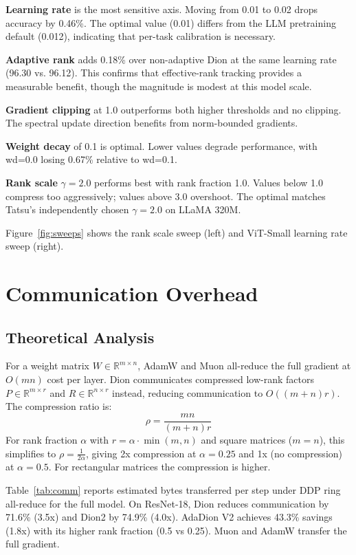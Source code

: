 \documentclass[10pt,twocolumn]{article}
\begin{document}
\textbf{Learning rate} is the most sensitive axis. Moving from 0.01 to 0.02 drops accuracy by 0.46\%. The optimal value (0.01) differs from the LLM pretraining default (0.012), indicating that per-task calibration is necessary.

\textbf{Adaptive rank} adds 0.18\% over non-adaptive Dion at the same learning rate (96.30 vs. 96.12). This confirms that effective-rank tracking provides a measurable benefit, though the magnitude is modest at this model scale.

\textbf{Gradient clipping} at 1.0 outperforms both higher thresholds and no clipping. The spectral update direction benefits from norm-bounded gradients.

\textbf{Weight decay} of 0.1 is optimal. Lower values degrade performance, with wd=0.0 losing 0.67\% relative to wd=0.1.

\textbf{Rank scale} $\gamma = 2.0$ performs best with rank fraction 1.0. Values below 1.0 compress too aggressively; values above 3.0 overshoot. The optimal matches Tatsu's independently chosen $\gamma = 2.0$ on LLaMA 320M.

Figure~\ref{fig:sweeps} shows the rank scale sweep (left) and ViT-Small learning rate sweep (right).

\section{Communication Overhead}

\subsection{Theoretical Analysis}

For a weight matrix $W \in \mathbb{R}^{m \times n}$, AdamW and Muon all-reduce the full gradient at $O(mn)$ cost per layer. Dion communicates compressed low-rank factors $P \in \mathbb{R}^{m \times r}$ and $R \in \mathbb{R}^{n \times r}$ instead, reducing communication to $O((m+n)r)$. The compression ratio is:
\[
\rho = \frac{mn}{(m+n)r}
\]
For rank fraction $\alpha$ with $r = \alpha \cdot \min(m,n)$ and square matrices ($m = n$), this simplifies to $\rho = \frac{1}{2\alpha}$, giving 2x compression at $\alpha = 0.25$ and 1x (no compression) at $\alpha = 0.5$. For rectangular matrices the compression is higher.

Table~\ref{tab:comm} reports estimated bytes transferred per step under DDP ring all-reduce for the full model. On ResNet-18, Dion reduces communication by 71.6\% (3.5x) and Dion2 by 74.9\% (4.0x). AdaDion V2 achieves 43.3\% savings (1.8x) with its higher rank fraction (0.5 vs 0.25). Muon and AdamW transfer the full gradient.
\end{document}
